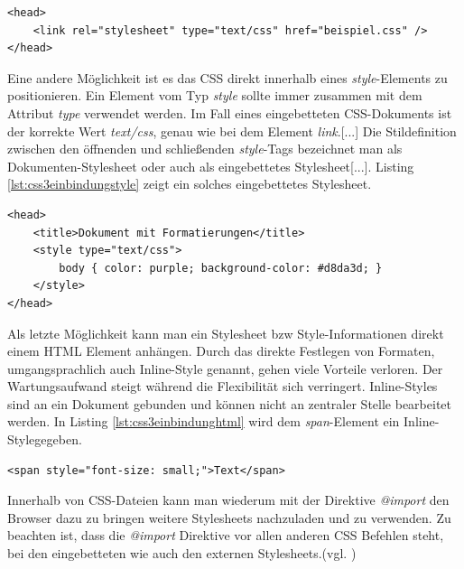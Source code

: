 \documentclass[12pt,a4paper,bibliography=totocnumbered,listof=totocnumbered]{scrartcl}
\begin{document}
	\vspace{1em}
	\begin{lstlisting}[caption=Stylesheet Einbindung über \textit{link}-Element, label=lst:css3einbindunglink]
<head>
    <link rel="stylesheet" type="text/css" href="beispiel.css" />
</head>
	\end{lstlisting}

Eine andere Möglichkeit ist es das CSS direkt innerhalb eines \textit{style}-Elements zu positionieren. Ein Element vom Typ \glqq \textit{style} sollte immer zusammen mit dem Attribut \textit{type} verwendet werden. Im Fall eines eingebetteten CSS-Dokuments ist der korrekte Wert \glqq \textit{text/css}\grqq, genau wie bei dem Element \textit{link}.[...] Die Stildefinition zwischen den öffnenden und schließenden \textit{style}-Tags bezeichnet man als Dokumenten-Stylesheet oder auch als eingebettetes Stylesheet[...].\grqq{}\cite[S.19]{MeyeCasc2005} Listing \ref{lst:css3einbindungstyle} zeigt ein solches eingebettetes Stylesheet.

	\vspace{1em}
	\begin{lstlisting}[caption=Stylesheet Einbindung über \textit{style}-Element, label=lst:css3einbindungstyle]
<head>
	<title>Dokument mit Formatierungen</title>
	<style type="text/css">
		body { color: purple; background-color: #d8da3d; }
	</style>
</head>
	\end{lstlisting}
	
Als letzte Möglichkeit kann man ein Stylesheet bzw Style-Informationen direkt einem HTML Element anhängen. \glqq Durch das direkte Festlegen von Formaten, umgangsprachlich auch \glqq Inline-Style\grqq{} genannt, gehen viele Vorteile verloren. Der Wartungsaufwand steigt während die Flexibilität sich verringert. Inline-Styles sind an ein Dokument gebunden und können nicht an zentraler Stelle bearbeitet werden.\grqq{}\cite{SelfHtml20144} In Listing \ref{lst:css3einbindunghtml} wird dem \textit{span}-Element ein \glqq Inline-Style\grqq gegeben.

	\vspace{1em}
	\begin{lstlisting}[caption=Stylesheet Einbindung in \textit{html}-Element, label=lst:css3einbindunghtml]
<span style="font-size: small;">Text</span>
	\end{lstlisting}
	
Innerhalb von CSS-Dateien kann man wiederum mit der Direktive \textit{@import} den Browser dazu zu bringen weitere Stylesheets nachzuladen und zu verwenden. Zu beachten ist, dass die \textit{@import} Direktive vor allen anderen CSS Befehlen steht, bei den eingebetteten wie auch den externen Stylesheets.(vgl. \cite[S.20]{MeyeCasc2005})
	
\end{document}
